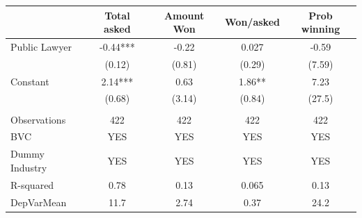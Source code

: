 \begin{tabular}{lcccc}
\midrule
\midrule
      & Total asked & Amount Won & Won/asked & Prob winning \\
\midrule
\midrule
Public Lawyer & -0.44*** & -0.22 & 0.027 & -0.59 \\
      & (0.12) & (0.81) & (0.29) & (7.59) \\
Constant & 2.14*** & 0.63  & 1.86** & 7.23 \\
      & (0.68) & (3.14) & (0.84) & (27.5) \\
      &       &       &       &  \\
Observations & 422   & 422   & 422   & 422 \\
BVC   & YES   & YES   & YES   & YES \\
Dummy Industry & YES   & YES   & YES   & YES \\
R-squared & 0.78  & 0.13  & 0.065 & 0.13 \\
DepVarMean & 11.7  & 2.74  & 0.37  & 24.2 \\
\bottomrule
\bottomrule
\end{tabular}%
